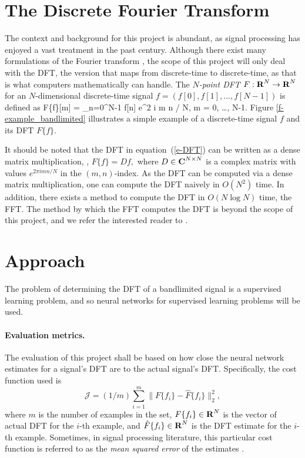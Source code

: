 \documentclass[12pt]{article}
\begin{document}
\section{The Discrete Fourier Transform}
The context and background for this project is abundant, as signal processing has enjoyed a vast treatment
in the past century. Although there exist many formulations of the Fourier transform \cite{O:17}, the scope 
of this project will only deal with the DFT, the version that maps from discrete-time to discrete-time, as 
that is what computers mathematically can handle. The \emph{$N$-point DFT} $F: {\mbox{\bf R}}^N \rightarrow {\mbox{\bf R}}^N$ for an 
$N$-dimensional discrete-time signal \cite{B:78,O:17} $f = (f[0], f[1], \ldots, f[N-1])$ is defined as
\BEQ \label{e-DFT}
F\{f\}[m] = \sum_{n=0}^{N-1} f[n] e^{2 \pi i m n / N}, \quad m = 0, \ldots, N-1.
\EEQ
Figure \ref{f-example_bandlimited} illustrates a simple example of a discrete-time 
signal $f$ and its DFT $F\{f\}.$

It should be noted that the DFT in equation~(\ref{e-DFT}) can be written as a dense matrix multiplication, \ie,
$F\{f\} = D f,$ where $D \in {\mbox{\bf C}}^{N \times N}$ is a complex matrix with values $e^{2 \pi i m n / N}$ in 
the $(m,n)$-index. As the DFT can be computed via a dense matrix multiplication, one can compute the DFT naively
in $O(N^2)$ time. In addition, there exists a method to compute the DFT in $O(N \log N)$ time, the FFT. The method 
by which the FFT computes the DFT is beyond the scope of this project, and we refer the interested reader to 
\cite{CT:65}.


\section{Approach} \label{s-approach}
The problem of determining the DFT of a bandlimited signal is a supervised learning problem, and so
neural networks for supervised learning problems will be used.

\paragraph{Evaluation metrics.}
The evaluation of this project shall be based on how close the neural network estimates for 
a signal's DFT are to the actual signal's DFT. Specifically, the cost function used is
\[
\mathcal J = (1/m) \sum_{i = 1}^{m} \|F\{f_i\} - \hat{F}\{f_i\} \|_2^2,
\]
where $m$ is the number of examples in the set, $F\{f_i\} \in {\mbox{\bf R}}^N$ is the vector of actual DFT 
for the $i$-th example, and $\hat{F}\{f_i\} \in {\mbox{\bf R}}^N$ is the DFT estimate for the $i$-th example. 
Sometimes, in signal processing literature, this particular cost function is referred to as the 
\emph{mean squared error} of the estimates \cite{DG:10}.
\end{document}
